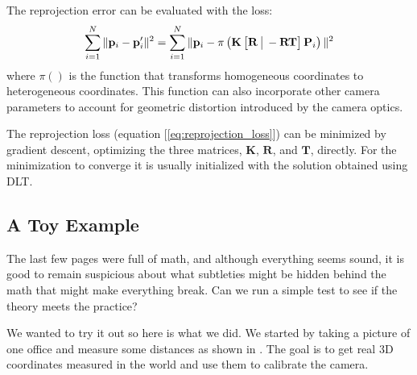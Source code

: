 The reprojection error can be evaluated with the loss:
\begin{equation}
\sum_{i=1}^N \|\mathbf{p}_i - \mathbf{p}'_i \|^2
=\sum_{i=1}^N 
\| \mathbf{p}_i - \pi \left( \mathbf{K} 
\begin{bmatrix}
\mathbf{R} ~ \vline ~ -\mathbf{R}\mathbf{T} 
\end{bmatrix}
\mathbf{P}_i \right) \| ^2 
\label{eq:reprojection_loss}
\end{equation}
where $\pi()$ is the function that transforms homogeneous coordinates to heterogeneous coordinates. This function can also incorporate other camera parameters to account for geometric distortion introduced by the camera optics.

The reprojection loss (equation [\ref{eq:reprojection_loss}]) can be minimized by gradient descent, optimizing the three matrices, $\mathbf{K}$, $\mathbf{R}$, and $\mathbf{T}$, directly. 
For the minimization to converge it is usually initialized with the solution obtained using DLT.


\subsection{A Toy Example}
\label{sec:a_toy_example}

The last few pages were full of math, and although everything seems sound, it is good to remain suspicious about what subtleties might be hidden behind the math that might make everything break.  Can we run a simple test to see if the theory meets the practice? 

We wanted to try it out so here is what we did. We started by taking a picture of one office and measure some distances as shown in \fig{\ref{fig:office_measurements}}. The goal is to get real 3D coordinates measured in the world and use them to calibrate the camera. 

